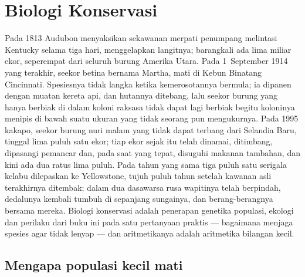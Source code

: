 \chapter{Biologi Konservasi}\label{ch:b3:conservation-biology}

Pada 1813 Audubon menyaksikan sekawanan merpati penumpang melintasi
Kentucky selama tiga hari, menggelapkan langitnya; barangkali ada lima
miliar ekor, seperempat dari seluruh burung Amerika Utara. Pada
1~September 1914 yang terakhir, seekor betina bernama Martha, mati di
Kebun Binatang Cincinnati. Spesiesnya tidak langka ketika kemerosotannya
bermula; ia dipanen dengan muatan kereta api, dan hutannya ditebang, lalu
seekor burung yang hanya berbiak di dalam koloni raksasa tidak dapat lagi
berbiak begitu koloninya menipis di bawah suatu ukuran yang tidak seorang
pun mengukurnya. Pada 1995 kakapo, seekor burung nuri malam yang tidak
dapat terbang dari Selandia Baru, tinggal lima puluh satu ekor; tiap ekor
sejak itu telah dinamai, ditimbang, dipasangi pemancar dan, pada saat
yang tepat, disuguhi makanan tambahan, dan kini ada dua ratus lima puluh.
Pada tahun yang sama tiga puluh satu serigala kelabu dilepaskan ke
Yellowstone, tujuh puluh tahun setelah kawanan asli terakhirnya ditembak;
dalam dua dasawarsa rusa wapitinya telah berpindah, dedalunya kembali
tumbuh di sepanjang sungainya, dan berang-berangnya bersama mereka.
Biologi konservasi adalah penerapan genetika populasi, ekologi dan
perilaku dari buku ini pada satu pertanyaan praktis --- bagaimana menjaga
spesies agar tidak lenyap --- dan aritmetikanya adalah aritmetika bilangan
kecil.

\section{Mengapa populasi kecil mati}

